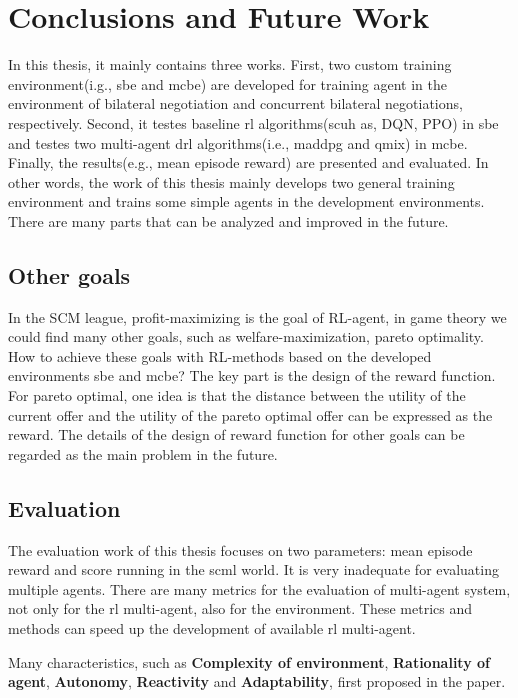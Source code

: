 \chapter{Conclusions and Future Work}
In this thesis, it mainly contains three works. First, two custom training environment(i.g., \gls{sbe} and \gls{mcbe}) are developed for  training agent in the environment of bilateral negotiation and concurrent bilateral negotiations, respectively. Second, it testes baseline \gls{rl} algorithms(scuh as, DQN, PPO) in \gls{sbe} and testes two multi-agent drl algorithms(i.e., maddpg and qmix) in \gls{mcbe}. Finally, the results(e.g., mean episode reward) are presented and evaluated. In other words, the work of this thesis mainly develops two general training environment and trains some simple agents in the development environments. There are many parts that can be analyzed and improved in the future.

\section{Other goals}
In the SCM league, profit-maximizing is the goal of RL-agent, in game theory we could find many other goals, such as welfare-maximization, pareto optimality. How to achieve these goals with RL-methods based on the developed environments \gls{sbe} and \gls{mcbe}? The key part is the design of the reward function. For pareto optimal, one idea is that the distance between the utility of the current offer and the utility of the pareto optimal offer can be expressed as the reward. The details of the design of reward function for other goals can be regarded as the main problem in the future.

\section{Evaluation}
The evaluation work of this thesis focuses on two parameters: mean episode reward and score running in the \gls{scml} world. It is very inadequate for evaluating multiple agents. There are many metrics for the evaluation of multi-agent system, not only for the \gls{rl} multi-agent, also for the environment. These metrics and methods can speed up the development of available \gls{rl} multi-agent. 

Many characteristics, such as \textbf{Complexity of environment}, \textbf{Rationality of agent}, \textbf{Autonomy}, \textbf{Reactivity} and \textbf{Adaptability}, first proposed in the paper\parencite{Bitonto2010}.

